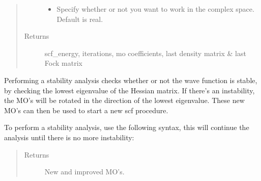 \documentclass[letterpaper,10pt,english]{sphinxmanual}
\begin{document}
\begin{fulllineitems}
\begin{fulllineitems}
\begin{quote}
\begin{description}
\begin{itemize}
\item {} 
 \textendash{} Specify whether or not you want to work in the complex space. Default is real.

\end{itemize}

\item[{Returns}] \leavevmode
scf\_energy, iterations, mo coefficients, last density matrix \& last Fock matrix

\end{description}\end{quote}

\end{fulllineitems}


\begin{fulllineitems}
\label{\detokenize{GHF:ghf.GHF.GHF.stability}}
Performing a stability analysis checks whether or not the wave function is stable, by checking the lowest
eigenvalue of the Hessian matrix. If there’s an instability, the MO’s will be rotated in the direction
of the lowest eigenvalue. These new MO’s can then be used to start a new scf procedure.

To perform a stability analysis, use the following syntax, this will continue the analysis until there is
no more instability:

\begin{sphinxVerbatim}[commandchars=\\\{\}]
           
   
  
 
      
    
\end{sphinxVerbatim}
\begin{quote}\begin{description}
\item[{Returns}] \leavevmode
New and improved MO’s.


\end{description}
\end{quote}
\end{fulllineitems}
\end{fulllineitems}
\end{document}
